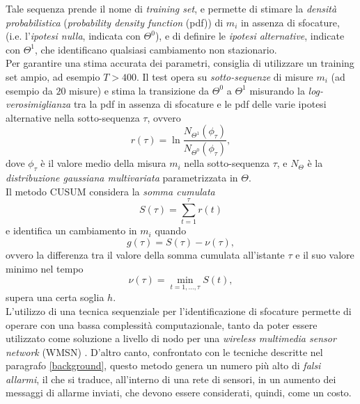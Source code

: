Tale sequenza prende il nome di \textit{training set}, e permette di stimare la \textit{densit\`a probabilistica} (\textit{probability density function} (pdf)) di $m_i$ in assenza di sfocature, (i.e. l'\textit{ipotesi nulla}, indicata con $\Theta^0$), e di definire le \textit{ipotesi alternative}, indicate con $\Theta^1$, che identificano qualsiasi cambiamento non stazionario.\\
Per garantire una stima accurata dei parametri, \cite{alippi2010detecting} consiglia di utilizzare un training set ampio, ad esempio $T > 400$.
Il test opera su \textit{sotto-sequenze} di misure $m_i$ (ad esempio da $20$ misure) e stima la transizione da $\Theta^0$ a $\Theta^1$ misurando la \textit{log-verosimiglianza} tra la pdf in assenza di sfocature e le pdf delle varie ipotesi alternative nella sotto-sequenza $\tau$, ovvero
\[ r(\tau) = \ln \frac{N_{\Theta^1}(\phi_{\tau})}{N_{\Theta^0}(\phi_{\tau})}, \]
dove $\phi_{\tau}$ \`e il valore medio della misura $m_i$ nella sotto-sequenza $\tau$, e $N_{\Theta}$ \`e la \textit{distribuzione gaussiana multivariata} parametrizzata in $\Theta$.\\
Il metodo CUSUM considera la \textit{somma cumulata} 
\[ S(\tau) = \sum^\tau_{t=1} r(t) \]
e identifica un cambiamento in $m_i$ quando \[g(\tau)=S(\tau)-\nu(\tau),\] ovvero la differenza tra il valore della somma cumulata all'istante $\tau$ e il suo valore minimo nel tempo \[\nu(\tau)=\min_{t=1,...,\tau}S(t),\] supera una certa soglia $h$.\\
L'utilizzo di una tecnica sequenziale per l'identificazione di sfocature permette di operare con una bassa complessit\`a computazionale, tanto da poter essere utilizzato come soluzione a livello di nodo per una \textit{wireless multimedia sensor network} (WMSN) \cite{akyildiz2007survey}.
D'altro canto, confrontato con le tecniche descritte nel paragrafo \ref{background}, questo metodo genera un numero pi\`u alto di \textit{falsi allarmi}, il che si traduce, all'interno di una rete di sensori, in un aumento dei messaggi di allarme inviati, che devono essere considerati, quindi, come un costo.